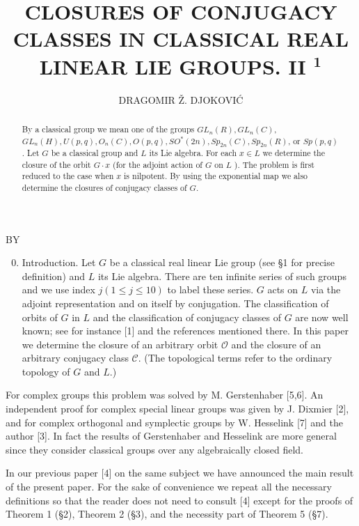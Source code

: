 \documentclass[10pt]{article}
\title{CLOSURES OF CONJUGACY CLASSES IN CLASSICAL REAL LINEAR LIE GROUPS. II ${ }^{\mathbf{1}}$ }
\author{DRAGOMIR Ž. DJOKOVIĆ}
\date{}
\begin{document}
\maketitle
\captionsetup{singlelinecheck=false}
BY



\begin{abstract}
By a classical group we mean one of the groups $G L_{n}(R), G L_{n}(C)$, $G L_{n}(H), U(p, q), O_{n}(C), O(p, q), S O^{*}(2 n), S p_{2 n}(C), S p_{2 n}(R)$, or $S p(p, q)$. Let $G$ be a classical group and $L$ its Lie algebra. For each $x \in L$ we determine the closure of the orbit $G \cdot x$ (for the adjoint action of $G$ on $L$ ). The problem is first reduced to the case when $x$ is nilpotent. By using the exponential map we also determine the closures of conjugacy classes of $G$.
\end{abstract}

\begin{enumerate}
  \setcounter{enumi}{-1}
  \item Introduction. Let $G$ be a classical real linear Lie group (see §1 for precise definition) and $L$ its Lie algebra. There are ten infinite series of such groups and we use index $j(1 \leqslant j \leqslant 10)$ to label these series. $G$ acts on $L$ via the adjoint representation and on itself by conjugation. The classification of orbits of $G$ in $L$ and the classification of conjugacy classes of $G$ are now well known; see for instance [1] and the references mentioned there. In this paper we determine the closure of an arbitrary orbit $\mathcal{O}$ and the closure of an arbitrary conjugacy class $\mathcal{C}$. (The topological terms refer to the ordinary topology of $G$ and $L$.)
\end{enumerate}

For complex groups this problem was solved by M. Gerstenhaber [5,6]. An independent proof for complex special linear groups was given by J. Dixmier [2], and for complex orthogonal and symplectic groups by W. Hesselink [7] and the author [3]. In fact the results of Gerstenhaber and Hesselink are more general since they consider classical groups over any algebraically closed field.

In our previous paper [4] on the same subject we have announced the main result of the present paper. For the sake of convenience we repeat all the necessary definitions so that the reader does not need to consult [4] except for the proofs of Theorem 1 (§2), Theorem 2 (§3), and the necessity part of Theorem 5 (§7).
\end{document}
